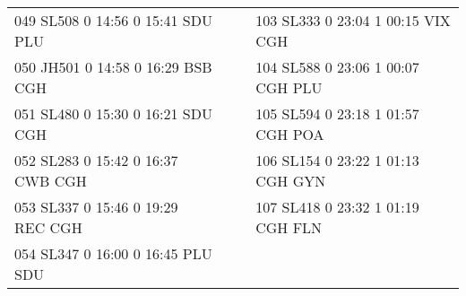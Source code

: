 \begin{scriptsize}
\begin{longtable}{l c c l}
049 SL508  0 14:56 0 15:41 SDU PLU & & & 103 SL333  0 23:04 1 00:15 VIX CGH \\

050 JH501  0 14:58 0 16:29 BSB CGH & & & 104 SL588  0 23:06 1 00:07 CGH PLU \\

051 SL480  0 15:30 0 16:21 SDU CGH & & & 105 SL594  0 23:18 1 01:57 CGH POA \\

052 SL283  0 15:42 0 16:37 CWB CGH & & & 106 SL154  0 23:22 1 01:13 CGH GYN \\

053 SL337  0 15:46 0 19:29 REC CGH & & & 107 SL418  0 23:32 1 01:19 CGH FLN \\

054 SL347  0 16:00 0 16:45 PLU SDU & & & \\

\end{longtable}

\end{scriptsize}
